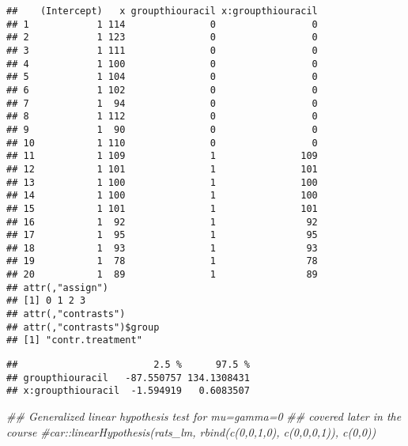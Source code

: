 \documentclass[]{book}
\newenvironment{Shaded}{\begin{snugshade}}{\end{snugshade}}
\newcommand{\CommentTok}[1]{\textcolor[rgb]{0.56,0.35,0.01}{\textit{#1}}}
\newcommand{\DataTypeTok}[1]{\textcolor[rgb]{0.13,0.29,0.53}{#1}}
\newcommand{\DecValTok}[1]{\textcolor[rgb]{0.00,0.00,0.81}{#1}}
\newcommand{\FloatTok}[1]{\textcolor[rgb]{0.00,0.00,0.81}{#1}}
\newcommand{\KeywordTok}[1]{\textcolor[rgb]{0.13,0.29,0.53}{\textbf{#1}}}
\newcommand{\NormalTok}[1]{#1}
\newcommand{\OperatorTok}[1]{\textcolor[rgb]{0.81,0.36,0.00}{\textbf{#1}}}
\theoremstyle{definition}
\theoremstyle{definition}
\theoremstyle{definition}
\theoremstyle{remark}
\begin{document}
\begin{verbatim}
##    (Intercept)   x groupthiouracil x:groupthiouracil
## 1            1 114               0                 0
## 2            1 123               0                 0
## 3            1 111               0                 0
## 4            1 100               0                 0
## 5            1 104               0                 0
## 6            1 102               0                 0
## 7            1  94               0                 0
## 8            1 112               0                 0
## 9            1  90               0                 0
## 10           1 110               0                 0
## 11           1 109               1               109
## 12           1 101               1               101
## 13           1 100               1               100
## 14           1 100               1               100
## 15           1 101               1               101
## 16           1  92               1                92
## 17           1  95               1                95
## 18           1  93               1                93
## 19           1  78               1                78
## 20           1  89               1                89
## attr(,"assign")
## [1] 0 1 2 3
## attr(,"contrasts")
## attr(,"contrasts")$group
## [1] "contr.treatment"
\end{verbatim}

\begin{Shaded}
\end{Shaded}

\begin{verbatim}
##                        2.5 %      97.5 %
## groupthiouracil   -87.550757 134.1308431
## x:groupthiouracil  -1.594919   0.6083507
\end{verbatim}

\begin{Shaded}
\begin{Highlighting}[]
\CommentTok{## Generalized linear hypothesis test for mu=gamma=0}
\CommentTok{## covered later in the course }
\CommentTok{#car::linearHypothesis(rats_lm, rbind(c(0,0,1,0), c(0,0,0,1)), c(0,0))}
\end{Highlighting}
\end{Shaded}
\end{document}
